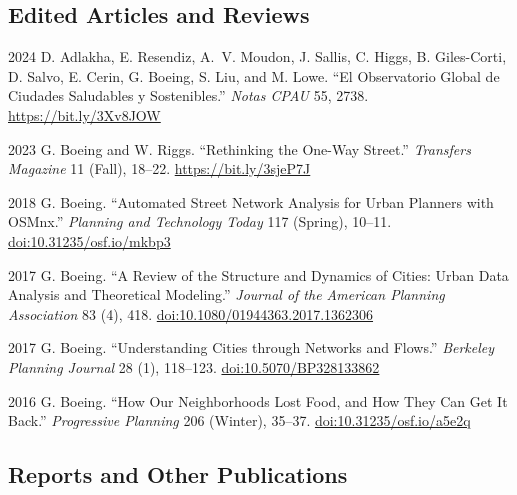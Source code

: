\documentclass[11pt,letterpaper]{report} %
\begin{document}
    \subsection*{Edited Articles and Reviews}

    \begin{tablist}

        \item[2024] \tab{} D. Adlakha, E. Resendiz, A.~V. Moudon, J. Sallis, C. Higgs, B. Giles-Corti, D. Salvo, E. Cerin, G. Boeing, S. Liu, and M. Lowe. \enquote{El Observatorio Global de Ciudades Saludables y Sostenibles.} \textit{Notas CPAU} 55, 2738. \href{https://bit.ly/3Xv8JOW}{https://bit.ly/3Xv8JOW}

        \item[2023] \tab{}G. Boeing and W. Riggs. \enquote{Rethinking the One-Way Street.} \textit{Transfers Magazine} 11 (Fall), 18--22. \href{https://bit.ly/3sjeP7J}{https://bit.ly/3sjeP7J}

        \item[2018] \tab{}G. Boeing. \enquote{Automated Street Network Analysis for Urban Planners with OSMnx.} \textit{Planning and Technology Today} 117 (Spring), 10--11. \href{https://doi.org/10.31235/osf.io/mkbp3}{doi:10.31235/osf.io/mkbp3}

        \item[2017] \tab{}G. Boeing. \enquote{A Review of the Structure and Dynamics of Cities: Urban Data Analysis and Theoretical Modeling.} \textit{Journal of the American Planning Association} 83 (4), 418. \href{https://doi.org/10.1080/01944363.2017.1362306}{doi:10.1080/01944363.2017.1362306}

        \item[2017] \tab{}G. Boeing. \enquote{Understanding Cities through Networks and Flows.} \textit{Berkeley Planning Journal} 28 (1), 118--123. \href{https://doi.org/10.5070/BP328133862}{doi:10.5070/BP328133862}

        \item[2016] \tab{}G. Boeing. \enquote{How Our Neighborhoods Lost Food, and How They Can Get It Back.} \textit{Progressive Planning} 206 (Winter), 35--37. \href{https://doi.org/10.31235/osf.io/a5e2q}{doi:10.31235/osf.io/a5e2q}

    \end{tablist}



    \subsection*{Reports and Other Publications}
\end{document}
